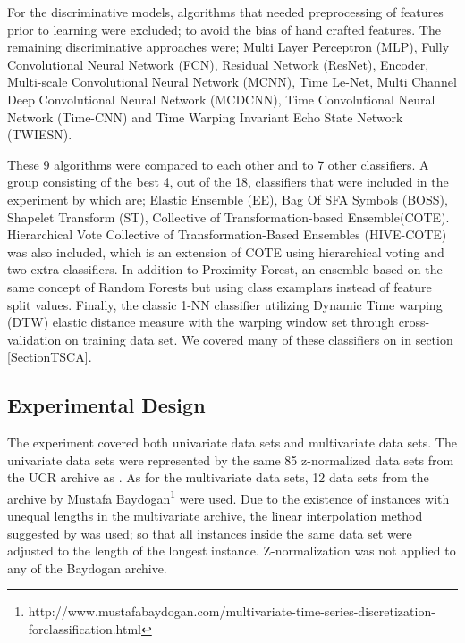 For the discriminative models, algorithms that needed preprocessing of features prior to learning were excluded; to avoid the bias of hand crafted features.
The remaining discriminative approaches were; Multi Layer Perceptron (MLP), Fully Convolutional Neural Network (FCN), Residual Network (ResNet), Encoder, Multi-scale Convolutional Neural Network (MCNN),
Time Le-Net, Multi Channel Deep Convolutional Neural Network (MCDCNN), Time Convolutional Neural Network (Time-CNN) and Time Warping Invariant Echo State Network (TWIESN).

These 9 algorithms were compared to each other and to 7 other classifiers.
A group consisting of the best 4, out of the 18, classifiers that were included in the experiment by \cite{bagnall2017great} which are; Elastic Ensemble (EE), Bag Of SFA Symbols (BOSS), Shapelet Transform (ST), Collective of Transformation-based Ensemble(COTE).
Hierarchical Vote Collective of Transformation-Based Ensembles (HIVE-COTE) was also included, which is an extension of COTE using hierarchical voting and two extra classifiers.
In addition to Proximity Forest, an ensemble based on the same concept of Random Forests but using class examplars instead of feature split values.
Finally, the classic 1-NN classifier utilizing Dynamic Time warping (DTW) elastic distance measure with the warping window set through cross-validation on training data set.
We covered many of these classifiers on in section \ref{SectionTSCA}.

\subsection{Experimental Design}
\label{subsectionDeepLearningReviewExperiment}
The experiment covered both univariate data sets and multivariate data sets. The univariate data sets were represented by the same 85 z-normalized data sets from the UCR archive as \cite{bagnall2017great}.
As for the multivariate data sets, 12 data sets from the archive by Mustafa Baydogan\footnote{http://www.mustafabaydogan.com/multivariate-time-series-discretization-forclassification.html}
were used. Due to the existence of instances with unequal lengths in the multivariate archive, the linear interpolation method suggested by \cite{ratanamahatana2005three} was used;
so that all instances inside the same data set were adjusted to the length of the longest instance. Z-normalization was not applied to any of the Baydogan archive.

